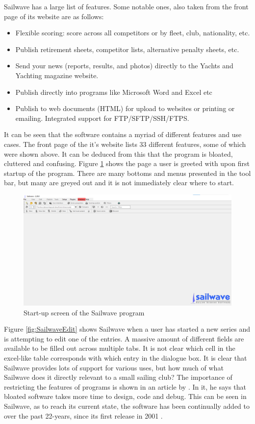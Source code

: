 \documentclass{l4proj}
\begin{document}
Sailwave has a large list of features. Some notable ones, also taken from the front page of its website \citep{sailwave} are as follows:
\begin{itemize}
    \item
    Flexible scoring: score across all competitors or by fleet, club, nationality, etc.
    \item
    Publish retirement sheets, competitor lists, alternative penalty sheets, etc.
    \item
    Send your news (reports, results, and photos) directly to the Yachts and Yachting magazine website.
    \item
    Publish directly into programs like Microsoft Word and Excel etc
    \item
    Publish to web documents (HTML) for upload to websites or printing or emailing. Integrated support for FTP/SFTP/SSH/FTPS.
\end{itemize}

It can be seen that the software contains a myriad of different features and use cases. The front page of the it’s website lists 33 different features, some of which were shown above. It can be deduced from this that the program is bloated, cluttered and confusing.
Figure \ref{fig:SailwaveEmpty} shows the page a user is greeted with upon first startup of the program. There are many bottoms and menus presented in the tool bar, but many are greyed out and it is not immediately clear where to start.

\begin{figure}[h!]
    \centering
    \includegraphics[width=0.6\linewidth]{images/SailwaveEmpty.png} 

    \caption{Start-up screen of the Sailwave program \citep{sailwave}
    }

    \label{fig:SailwaveEmpty} 
\end{figure}

Figure \ref{fig:SailwaveEdit} shows Sailwave when a user has started a new series and is attempting to edit one of the entries. A massive amount of different fields are available to be filled out across multiple tabs. It is not clear which cell in the excel-like table corresponds with which entry in the dialogue box. It is clear that Sailwave provides lots of support for various uses, but how much of what Sailwave does it directly relevant to a small sailing club? The importance of restricting the features of programs is shown in an article by \citet{leanSoftware}. In it, he says that bloated software takes more time to design, code and debug. This can be seen in Sailwave, as to reach its current state, the software has been continually added to over the past 22-years, since its first release in 2001 \citep{sailwave}.
\end{document}
